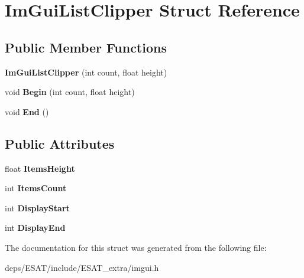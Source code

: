 \hypertarget{struct_im_gui_list_clipper}{}\section{Im\+Gui\+List\+Clipper Struct Reference}
\label{struct_im_gui_list_clipper}
\subsection*{Public Member Functions}
\begin{DoxyCompactItemize}
\item 
\mbox{\label{struct_im_gui_list_clipper_a0f617a2324f530ed546ee331aedfe269}} 
{\bfseries Im\+Gui\+List\+Clipper} (int count, float height)
\item 
\mbox{\label{struct_im_gui_list_clipper_a00841ea749a58766ccd624a09c8e9153}} 
void {\bfseries Begin} (int count, float height)
\item 
\mbox{\label{struct_im_gui_list_clipper_a3e6aec0db317985319a78513fc2c8068}} 
void {\bfseries End} ()
\end{DoxyCompactItemize}
\subsection*{Public Attributes}
\begin{DoxyCompactItemize}
\item 
\mbox{\label{struct_im_gui_list_clipper_a19762cb78ff0adccb414027c25678a60}} 
float {\bfseries Items\+Height}
\item 
\mbox{\label{struct_im_gui_list_clipper_a4e2b4e8efe10615d04ad2aeea467f522}} 
int {\bfseries Items\+Count}
\item 
\mbox{\label{struct_im_gui_list_clipper_a9d096e06e5633fd77a8a209c00fe454a}} 
int {\bfseries Display\+Start}
\item 
\mbox{\label{struct_im_gui_list_clipper_aa49e30d04ad8f8b95fbaa62dfbb4ea3e}} 
int {\bfseries Display\+End}
\end{DoxyCompactItemize}


The documentation for this struct was generated from the following file\+:\begin{DoxyCompactItemize}
\item 
deps/\+E\+S\+A\+T/include/\+E\+S\+A\+T\+\_\+extra/imgui.\+h\end{DoxyCompactItemize}
